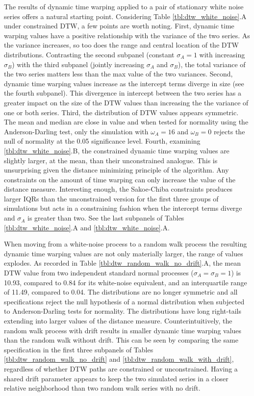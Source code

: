The results of dynamic time warping applied to a pair of stationary white noise series offers a natural starting point. Considering Table \ref{tbl:dtw_white_noise}.A under constrained DTW, a few points are worth noting. First, dynamic time warping values have a positive relationship with the variance of the two series. As the variance increases, so too does the range and central location of the DTW distributions. Contrasting the second subpanel (constant $\sigma_{A}=1$ with increasing $\sigma_{B}$) with the third subpanel (jointly increasing $\sigma_{A}$ and $\sigma_{B}$), the total variance of the two series matters less than the max value of the two variances. Second, dynamic time warping values increase as the intercept terms diverge in size (see the fourth subpanel). This divergence in intercept between the two series has a greater impact on the size of the DTW values than increasing the the variance of one or both series. Third, the distribution of DTW values appears symmetric. The mean and median are close in value and when tested for normality using the Anderson-Darling test, only the simulation with $\omega_{A}=16$ and $\omega_{B}=0$ rejects the null of normality at the 0.05 significance level. Fourth, examining \ref{tbl:dtw_white_noise}.B, the constrained dynamic time warping values are slightly larger, at the mean, than their unconstrained analogue. This is unsurprising given the distance minimizing principle of the algorithm. Any constraints on the amount of time warping can only increase the value of the distance measure. Interesting enough, the Sakoe-Chiba constraints produces larger IQRs than the unconstrained version for the first three groups of simulations but acts in a constraining fashion when the intercept terms diverge and $\sigma_{A}$ is greater than two. See the last subpanels of Tables \ref{tbl:dtw_white_noise}.A and \ref{tbl:dtw_white_noise}.A.

When moving from a white-noise process to a random walk process the resulting dynamic time warping values are not only materially larger, the range of values explodes. As recorded in Table \ref{tbl:dtw_random_walk_no_drift}.A, the mean DTW value from two independent standard normal processes ($\sigma_{A}=\sigma_{B}=1$) is 10.93, compared to 0.84 for its white-noise equivalent, and an interquartile range of 11.49, compared to 0.04. The distributions are no longer symmetric and all specifications reject the null hypothesis of a normal distribution when subjected to Anderson-Darling tests for normality. The distributions have long right-tails extending into larger values of the distance measure. Counterintuitively, the random walk process with drift results in smaller dynamic time warping values than the random walk without drift. This can be seen by comparing the same specification in the first three subpanels of Tables \ref{tbl:dtw_random_walk_no_drift} and \ref{tbl:dtw_random_walk_with_drift}, regardless of whether DTW paths are constrained or unconstrained. Having a shared drift parameter appears to keep the two simulated series in a closer relative neighborhood than two random walk series with no drift.

